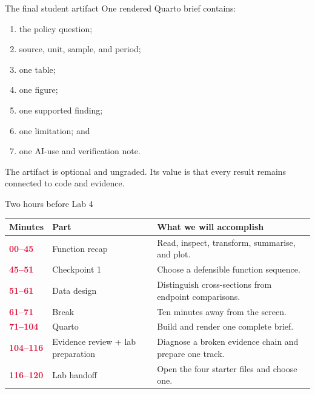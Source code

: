 \begin{frame}{The final student artifact}
One rendered Quarto brief contains:
\vspace{0.25cm}
\begin{enumerate}
\item the policy question;
\item source, unit, sample, and period;
\item one table;
\item one figure;
\item one supported finding;
\item one limitation; and
\item one AI-use and verification note.
\end{enumerate}
\vspace{0.25cm}
The artifact is optional and ungraded. Its value is that every result remains connected to code and evidence.
\end{frame}

\begin{frame}{Two hours before Lab 4}
\small
\begingroup
\renewcommand{\arraystretch}{1.18}
\begin{tabularx}{\textwidth}{@{}
  >{\RaggedRight\arraybackslash}p{1.6cm}
  >{\RaggedRight\arraybackslash}p{2.6cm}
  >{\RaggedRight\arraybackslash}X
@{}}
\toprule
\textbf{Minutes} & \textbf{Part} & \textbf{What we will accomplish} \\
\midrule
\textcolor{crimson}{\textbf{00--45}} & Function recap & Read, inspect, transform, summarise, and plot. \\
\textcolor{crimson}{\textbf{45--51}} & Checkpoint 1 & Choose a defensible function sequence. \\
\textcolor{crimson}{\textbf{51--61}} & Data design & Distinguish cross-sections from endpoint comparisons. \\
\textcolor{crimson}{\textbf{61--71}} & Break & Ten minutes away from the screen. \\
\textcolor{crimson}{\textbf{71--104}} & Quarto & Build and render one complete brief. \\
\textcolor{crimson}{\textbf{104--116}} & Evidence review + lab preparation & Diagnose a broken evidence chain and prepare one track. \\
\textcolor{crimson}{\textbf{116--120}} & Lab handoff & Open the four starter files and choose one. \\
\bottomrule
\end{tabularx}
\endgroup
\end{frame}
